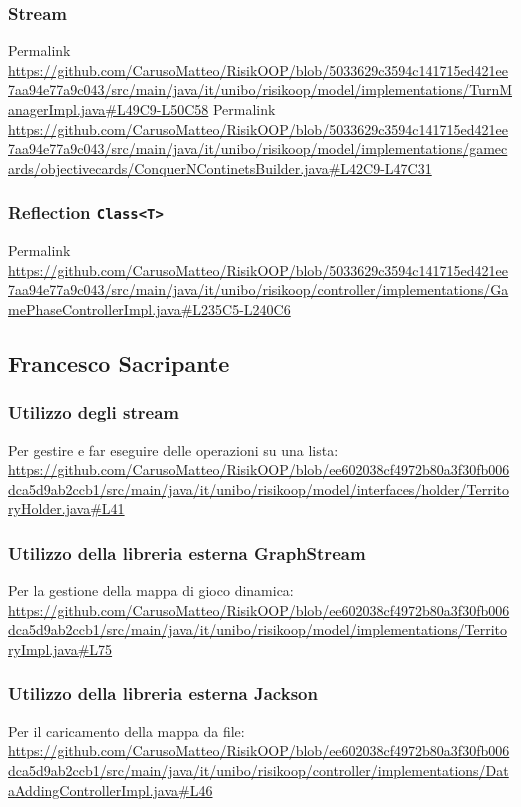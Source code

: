 \documentclass[a4paper,12pt]{report}
\begin{document}
\subsubsection{Stream}
Permalink \url{https://github.com/CarusoMatteo/RisikOOP/blob/5033629c3594c141715ed421ee7aa94e77a9c043/src/main/java/it/unibo/risikoop/model/implementations/TurnManagerImpl.java#L49C9-L50C58}
Permalink \url{https://github.com/CarusoMatteo/RisikOOP/blob/5033629c3594c141715ed421ee7aa94e77a9c043/src/main/java/it/unibo/risikoop/model/implementations/gamecards/objectivecards/ConquerNContinetsBuilder.java#L42C9-L47C31}

\subsubsection{Reflection \texttt{Class<T>}}
Permalink \url{https://github.com/CarusoMatteo/RisikOOP/blob/5033629c3594c141715ed421ee7aa94e77a9c043/src/main/java/it/unibo/risikoop/controller/implementations/GamePhaseControllerImpl.java#L235C5-L240C6}

\subsection{Francesco Sacripante}
\subsubsection{Utilizzo degli stream}
Per gestire e far eseguire delle operazioni su una lista: \url{https://github.com/CarusoMatteo/RisikOOP/blob/ee602038cf4972b80a3f30fb006dca5d9ab2ccb1/src/main/java/it/unibo/risikoop/model/interfaces/holder/TerritoryHolder.java#L41}
\subsubsection{Utilizzo della libreria esterna GraphStream}
Per la gestione della mappa di gioco dinamica: \url{https://github.com/CarusoMatteo/RisikOOP/blob/ee602038cf4972b80a3f30fb006dca5d9ab2ccb1/src/main/java/it/unibo/risikoop/model/implementations/TerritoryImpl.java#L75}
\subsubsection{Utilizzo della libreria esterna Jackson}
Per il caricamento della mappa da file: \url{https://github.com/CarusoMatteo/RisikOOP/blob/ee602038cf4972b80a3f30fb006dca5d9ab2ccb1/src/main/java/it/unibo/risikoop/controller/implementations/DataAddingControllerImpl.java#L46}
\end{document}
